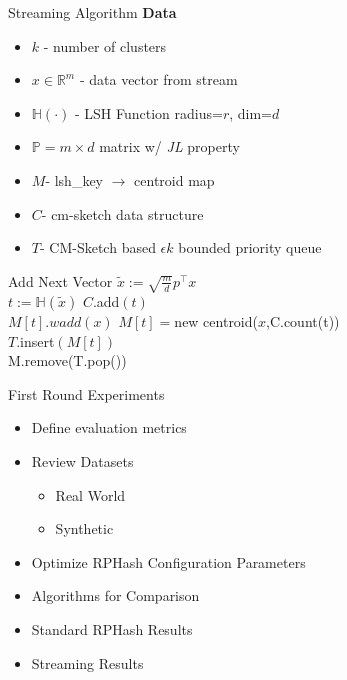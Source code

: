 \documentclass[12pt]{beamer}
\begin{document}
\begin{frame}[plain]{Streaming Algorithm}
  \textbf{Data} \\
\begin{itemize}
    \item  $k$ - number of clusters\\
    \item  $x \in\mathbb{R}^m$ - data vector from stream\\
    \item  $\mathbb{H}(\cdot)$ - LSH Function radius=$r$, dim=$d$\\
    \item  $\mathbb{P} = m \times d $ matrix w/ \emph{JL} property\\
    \item  $M$- lsh\_key $\rightarrow$ centroid map \\
    \item  $C$- cm-sketch data structure \\
    \item  $T$- CM-Sketch based $\epsilon k$ bounded priority queue\\
\end{itemize}
\end{frame}

\begin{frame}[plain]{Add Next Vector}
  {
    $\tilde{x}:= \sqrt{\frac{m}{d}}p^{\intercal}x$ \\%
    $t := \mathbb{H}(\tilde{x})$ %
    $C$.add$(t)$\\
    {
      $M[t].wadd(x)$  %
    }
    {
	$M[t]=$new centroid($x$,C.count(t))\\
	$T$.insert$(M[t])$\\
    }
    M.remove(T.pop())  %
  }
\end{frame}

\begin{frame}[plain]{First Round Experiments}
 \begin{itemize}
 \item Define evaluation metrics
 \item Review Datasets
 \begin{itemize}
  \item Real World
  \item Synthetic
 \end{itemize}
 \item Optimize RPHash Configuration Parameters
 \item Algorithms for Comparison
 \item Standard RPHash Results
 \item Streaming Results
\end{itemize}
\end{frame}
\end{document}
